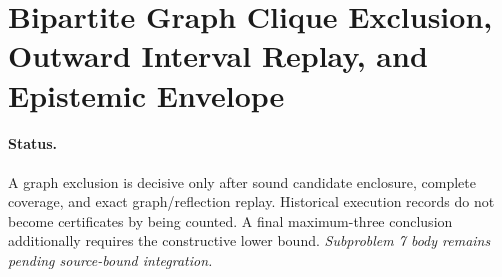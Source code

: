 \documentclass[11pt,a4paper]{article}
\theoremstyle{plain}
\theoremstyle{definition}
\begin{document}
\section{Bipartite Graph Clique Exclusion, Outward Interval Replay, and Epistemic Envelope}
\paragraph{Status.} A graph exclusion is decisive only after sound candidate enclosure, complete coverage, and exact graph/reflection replay. Historical execution records do not become certificates by being counted. A final maximum-three conclusion additionally requires the constructive lower bound.
\emph{Subproblem 7 body remains pending source-bound integration.}
\end{document}
